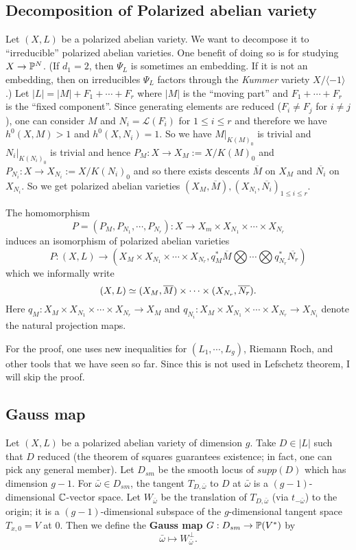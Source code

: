 \subsection{Decomposition of Polarized abelian variety}
Let $(X,L)$ be a polarized abelian variety. We want to decompose it to ``irreducible'' polarized abelian varieties. One benefit of doing so is for studying $X\to {\mathbb P}^N$. (If $d_1=2$, then $\Psi_L$ is sometimes an embedding. If it is not an embedding, then on irreducibles $\Psi_L$ factors through the \emph{Kummer} variety $X/\langle -1\rangle$.) Let $|L|=|M|+F_1+\cdots+F_r$ where $|M|$ is the ``moving part'' and $F_1+\cdots+F_r$ is the ``fixed component''. Since generating elements are reduced ($F_i\not=F_j$ for $i\not=j$), one can consider $M$ and $N_i=\mathcal{L}(F_i)$ for $1\leq i\leq r$ and therefore we have $h^0(X,M)>1$ and $h^0(X,N_i)=1$. So we have $M|_{K(M)_0}$ is trivial and $N_i|_{K(N_i)_0}$ is trivial and hence $P_M:X\to X_M:=X/K(M)_0$ and $P_{N_i}:X\to X_{N_i}:=X/K(N_i)_0$ and so there exists descents $\overline{M}$ on $X_M$ and $\overline{N_i}$ on $X_{N_i}$. So we get polarized abelian varieties $(X_M,\overline{M}),(X_{N_i},\overline{N_i})_{1\leq i \leq r}$. 

\begin{theorem}
The homomorphism 
$$P=(P_M,P_{N_1},\cdots,P_{N_r}):X\to X_m\times X_{N_1}\times\cdots \times X_{N_r}$$
induces an isomorphism of polarized abelian varieties
$$P:(X,L)\to (X_M\times X_{N_1}\times \cdots \times X_{N_r}, q_M^* \overline{M}\bigotimes \cdots \bigotimes q_{N_r}^* \overline{N_r})$$
which we informally write 
$$(X,L)\simeq (X_M,\overline{M})\times \cdots \times (X_{N_r},\overline{N_r}).$$
Here $q_M: X_M\times X_{N_1}\times \cdots \times X_{N_r} \rightarrow X_M$ and $q_{N_i}: X_{M}\times X_{N_1}\times \cdots \times X_{N_r} \rightarrow X_{N_i}$ denote the natural projection maps.
\end{theorem}

For the proof, one uses new inequalities for $(L_1,\cdots, L_g)$, Riemann Roch, and other tools that we have seen so far. Since this is not used in Lefschetz theorem, I will skip the proof.

\subsection{Gauss map}

Let $(X,L)$ be a polarized abelian variety of dimension $g$. Take $D\in |L|$ such that $D$ reduced (the theorem of squares guarantees existence; in fact, one can pick any general member). Let $D_{sm}$ be the smooth locus of $supp(D)$ which has dimension $g-1$. For $\bar{\omega}\in D_{sm}$, the tangent $T_{D,\bar{\omega}}$ to $D$ at $\bar{\omega}$ is a $(g-1)$-dimensional ${\mathbb C}$-vector space. Let $W_{\bar{\omega}}$ be the translation of $T_{D,\bar{\omega}}$ (via $t_{-\bar{\omega}}$) to the origin; it is a $(g-1)$-dimensional subspace of the $g$-dimensional tangent space $T_{x,0}=V$ at $0$. Then we define the \textbf{Gauss map} $G:D_{sm}\to {\mathbb P}(V^*)$ by 
\[
\bar{\omega}\mapsto W_{\bar{\omega}}^\perp.
\]

